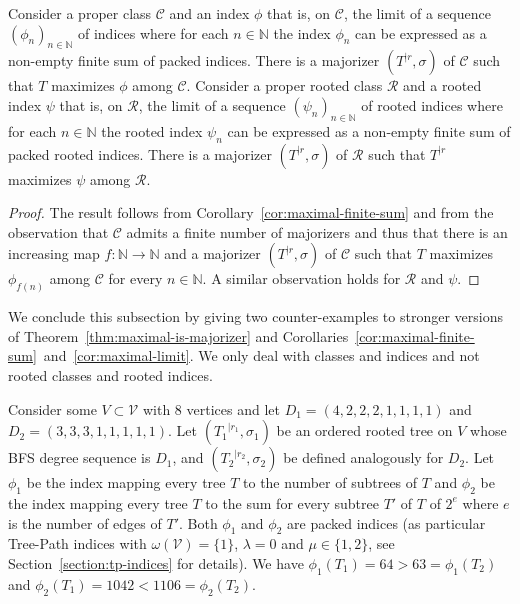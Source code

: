\documentclass[11 pt]{modarticle}
\newcommand{\cN}{\mathbb{N}}
\newcommand{\vset}{\mathcal{V}}
\newcommand{\wmap}{\omega}
\newcommand{\rtree}[2]{{#1}^{\lvert #2}}
\newcommand{\ortree}[3]{(\rtree{#1}{#2},{#3})}
\newcommand{\tclass}{\mathcal{C}}
\newcommand{\rtclass}{\mathcal{R}}
\begin{document}
\begin{cor}\label{cor:maximal-limit}
Consider a proper class $\tclass$ and an index $\phi$ that is, on $\tclass$, the limit of a sequence $(\phi_n)_{n \in \cN}$ of indices where for each $n \in \cN$ the index $\phi_n$ can be expressed as a non-empty finite sum of packed indices. There is a majorizer $\ortree{T}{r}{\sigma}$ of $\tclass$ such that $T$ maximizes $\phi$ among $\tclass$. Consider a proper rooted class $\rtclass$ and a rooted index $\psi$ that is, on $\rtclass$, the limit of a sequence $(\psi_n)_{n \in \cN}$ of rooted indices where for each $n \in \cN$ the rooted index $\psi_n$ can be expressed as a non-empty finite sum of packed rooted indices. There is a majorizer $\ortree{T}{r}{\sigma}$ of $\rtclass$ such that $\rtree{T}{r}$ maximizes $\psi$ among $\rtclass$.
\end{cor}

\begin{proof}
The result follows from Corollary~\ref{cor:maximal-finite-sum} and from the observation that $\tclass$ admits a finite number of majorizers and thus that there is an increasing map $f : \cN \to \cN$ and a majorizer $\ortree{T}{r}{\sigma}$ of $\tclass$ such that $T$ maximizes $\phi_{f(n)}$ among $\tclass$ for every $n \in \cN$. A similar observation holds for $\rtclass$ and $\psi$.
\end{proof}

We conclude this subsection by giving two counter-examples to stronger versions of Theorem~\ref{thm:maximal-is-majorizer} and Corollaries~\ref{cor:maximal-finite-sum}~and~\ref{cor:maximal-limit}. We only deal with classes and indices and not rooted classes and rooted indices.

Consider some $V \subset \vset$ with 8 vertices and let $D_1 = (4, 2, 2, 2, 1, 1, 1, 1)$ and $D_2 = (3, 3, 3, 1, 1, 1, 1, 1)$. Let $\ortree{T_1}{r_1}{\sigma_1}$ be an ordered rooted tree on $V$ whose BFS degree sequence is $D_1$, and $\ortree{T_2}{r_2}{\sigma_2}$ be defined analogously for $D_2$. Let $\phi_1$ be the index mapping every tree $T$ to the number of subtrees of $T$ and $\phi_2$ be the index mapping every tree $T$ to the sum for every subtree $T'$ of $T$ of $2^e$ where $e$ is the number of edges of $T'$. Both $\phi_1$ and $\phi_2$ are packed indices (as particular Tree-Path indices with $\wmap(\vset) = \{1\}$, $\lambda = 0$ and $\mu \in \{1,2\}$, see Section~\ref{section:tp-indices} for details). We have $\phi_1(T_1) = 64 > 63 = \phi_1(T_2)$ and $\phi_2(T_1) = 1042 < 1106 = \phi_2(T_2)$.
\end{document}
